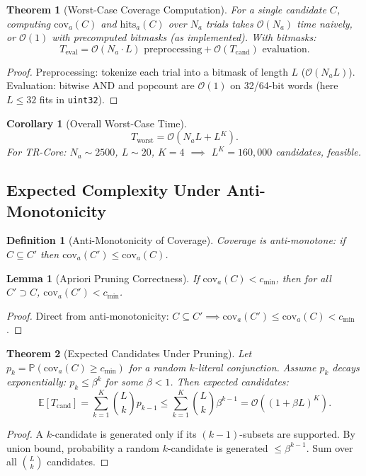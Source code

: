 \documentclass[11pt]{article}
\newcommand{\E}{\mathbb{E}}
\newcommand{\Prob}{\mathbb{P}}
\newcommand{\Oh}{\mathcal{O}}
\newtheorem{theorem}{Theorem}
\newtheorem{lemma}{Lemma}
\newtheorem{corollary}{Corollary}
\newtheorem{definition}{Definition}
\begin{document}
\begin{theorem}[Worst-Case Coverage Computation]
For a single candidate $C$, computing $\mathrm{cov}_a(C)$ and $\mathrm{hits}_a(C)$ over $N_a$ trials takes $\Oh(N_a)$ time naively, or $\Oh(1)$ with precomputed bitmasks (as implemented). With bitmasks:
\[
T_{\text{eval}} = \Oh(N_a \cdot L) \text{ preprocessing} + \Oh(T_{\text{cand}}) \text{ evaluation}.
\]
\end{theorem}
\begin{proof}
Preprocessing: tokenize each trial into a bitmask of length $L$ ($\Oh(N_a L)$). Evaluation: bitwise AND and popcount are $\Oh(1)$ on 32/64-bit words (here $L \leq 32$ fits in \texttt{uint32}).
\end{proof}

\begin{corollary}[Overall Worst-Case Time]
\[
T_{\text{worst}} = \Oh(N_a L + L^K).
\]
For TR-Core: $N_a \sim 2500$, $L \sim 20$, $K=4$ $\implies$ $L^K = 160,\!000$ candidates, feasible.
\end{corollary}

\subsection{Expected Complexity Under Anti-Monotonicity}

\begin{definition}[Anti-Monotonicity of Coverage]
Coverage is anti-monotone: if $C \subseteq C'$ then $\mathrm{cov}_a(C') \leq \mathrm{cov}_a(C)$.
\end{definition}

\begin{lemma}[Apriori Pruning Correctness]
If $\mathrm{cov}_a(C) < c_{\min}$, then for all $C' \supset C$, $\mathrm{cov}_a(C') < c_{\min}$.
\end{lemma}
\begin{proof}
Direct from anti-monotonicity: $C \subseteq C' \implies \mathrm{cov}_a(C') \leq \mathrm{cov}_a(C) < c_{\min}$.
\end{proof}

\begin{theorem}[Expected Candidates Under Pruning]
Let $p_k = \Prob(\mathrm{cov}_a(C) \geq c_{\min})$ for a random $k$-literal conjunction. Assume $p_k$ decays exponentially: $p_k \leq \beta^k$ for some $\beta < 1$. Then expected candidates:
\[
\E[T_{\text{cand}}] = \sum_{k=1}^K \binom{L}{k} p_{k-1} \leq \sum_{k=1}^K \binom{L}{k} \beta^{k-1} = \Oh((1+\beta L)^K).
\]
\end{theorem}
\begin{proof}
A $k$-candidate is generated only if its $(k-1)$-subsets are supported. By union bound, probability a random $k$-candidate is generated $\leq \beta^{k-1}$. Sum over all $\binom{L}{k}$ candidates.
\end{proof}
\end{document}
